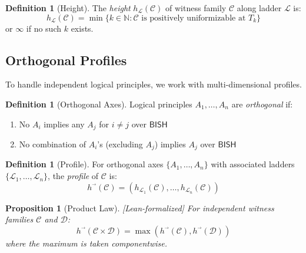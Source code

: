 \documentclass[11pt]{article}
\theoremstyle{plain}
\newtheorem{proposition}[theorem]{Proposition}
\theoremstyle{definition}
\newtheorem{definition}[theorem]{Definition}
\newcommand{\N}{\mathbb{N}}
\newcommand{\BISH}{\mathsf{BISH}}
\newcommand{\leanok}{\textsf{\textcolor{green!70!black}{[Lean-formalized]}}}
\begin{document}
\begin{definition}[Height]\label{def:height}
The \emph{height} $h_{\mathcal{L}}(\mathcal{C})$ of witness family $\mathcal{C}$ along ladder $\mathcal{L}$ is:
\[
h_{\mathcal{L}}(\mathcal{C}) = \min\{k \in \N : \mathcal{C} \text{ is positively uniformizable at } T_k\}
\]
or $\infty$ if no such $k$ exists.
\end{definition}

\subsection{Orthogonal Profiles}

To handle independent logical principles, we work with multi-dimensional profiles.

\begin{definition}[Orthogonal Axes]\label{def:orthogonal}
Logical principles $A_1, \ldots, A_n$ are \emph{orthogonal} if:
\begin{enumerate}
\item No $A_i$ implies any $A_j$ for $i \neq j$ over $\BISH$
\item No combination of $A_i$'s (excluding $A_j$) implies $A_j$ over $\BISH$
\end{enumerate}
\end{definition}

\begin{definition}[Profile]\label{def:profile}
For orthogonal axes $\{A_1, \ldots, A_n\}$ with associated ladders $\{\mathcal{L}_1, \ldots, \mathcal{L}_n\}$, the \emph{profile} of $\mathcal{C}$ is:
\[
h^{\vec{}}(\mathcal{C}) = (h_{\mathcal{L}_1}(\mathcal{C}), \ldots, h_{\mathcal{L}_n}(\mathcal{C}))
\]
\end{definition}

\begin{proposition}[Product Law]\label{prop:product} \leanok
For independent witness families $\mathcal{C}$ and $\mathcal{D}$:
\[
h^{\vec{}}(\mathcal{C} \times \mathcal{D}) = \max(h^{\vec{}}(\mathcal{C}), h^{\vec{}}(\mathcal{D}))
\]
where the maximum is taken componentwise.
\end{proposition}
\end{document}
